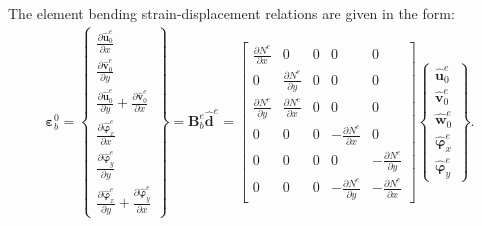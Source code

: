The element bending strain-displacement relations are given in the form:
\begin{eqnarray}
	\boldsymbol{\varepsilon}_b^0 = 
	\left \{ \begin{array}{c}
		\frac{\partial \widehat{\textbf{u}}_0^e}{\partial x} \\
		\frac{\partial \widehat{\textbf{v}}_0^e}{\partial y} \\
		\frac{\partial \widehat{\textbf{u}}_0^e}{\partial y} + \frac{\partial \widehat{\textbf{v}}_0^e}{\partial x}\\
		\frac{\partial \widehat{\boldsymbol{\varphi}}_x^e}{\partial x} \\
		\frac{\partial \widehat{\boldsymbol{\varphi}}_y^e}{\partial y} \\
		\frac{\partial \widehat{\boldsymbol{\varphi}}_x^e}{\partial y} + \frac{\partial \widehat{\boldsymbol{\varphi}}_y^e}{\partial x}
	\end{array} \right\} = 
	\textbf{B}_b^e\widehat{\textbf{d}}^e = 
	\left [
	\begin{array}{ccccc}
		\frac{\partial N^e}{\partial x} & 0 & 0 & 0 & 0\\
		0 & \frac{\partial N^e}{\partial y} & 0 & 0 & 0\\
		\frac{\partial N^e}{\partial y} & \frac{\partial N^e}{\partial x} & 0 & 0 & 0\\
		0 & 0 & 0 & -\frac{\partial N^e}{\partial x} & 0\\
		0 & 0 & 0 & 0 & -\frac{\partial N^e}{\partial y}\\
		0 & 0 & 0 & -\frac{\partial N^e}{\partial y} & -\frac{\partial N^e}{\partial x}
	\end{array} \right]
	\left \{ \begin{array}{c}
		\widehat{\textbf{u}}_0^e \\
		\widehat{\textbf{v}}_0^e \\
		\widehat{\textbf{w}}_0^e \\
		\widehat{\boldsymbol{\varphi}}_x^e \\
		\widehat{\boldsymbol{\varphi}}_y^e
	\end{array} \right\}.
\end{eqnarray}

